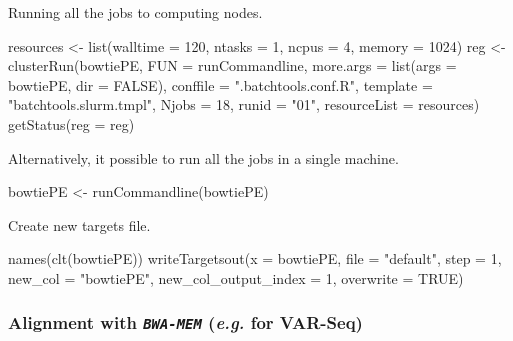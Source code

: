 \documentclass[14pt,]{article}
\newcommand{\hlnum}[1]{\textcolor[rgb]{0.816,0.125,0.439}{#1}}%
\newcommand{\hlstr}[1]{\textcolor[rgb]{0.251,0.627,0.251}{#1}}%
\newcommand{\hlstd}[1]{\textcolor[rgb]{0.251,0.251,0.251}{#1}}%
\newcommand{\hlkwc}[1]{\textcolor[rgb]{0.251,0.251,0.251}{#1}}%
\newcommand{\hlkwd}[1]{\textcolor[rgb]{0.878,0.439,0.125}{#1}}%
\newenvironment{Shaded}{\begin{myshaded}}{\end{myshaded}}
\newcommand{\KeywordTok}[1]{\hlkwd{#1}}
\newcommand{\DataTypeTok}[1]{\hlkwc{#1}}
\newcommand{\DecValTok}[1]{\hlnum{#1}}
\newcommand{\StringTok}[1]{\hlstr{#1}}
\newcommand{\OtherTok}[1]{{#1}}
\newcommand{\NormalTok}[1]{\hlstd{#1}}
\begin{document}
Running all the jobs to computing nodes.

\begin{Shaded}
\begin{Highlighting}[]
\NormalTok{resources <-}\StringTok{ }\KeywordTok{list}\NormalTok{(}\DataTypeTok{walltime =} \DecValTok{120}\NormalTok{, }\DataTypeTok{ntasks =} \DecValTok{1}\NormalTok{, }\DataTypeTok{ncpus =} \DecValTok{4}\NormalTok{, }\DataTypeTok{memory =} \DecValTok{1024}\NormalTok{)}
\NormalTok{reg <-}\StringTok{ }\KeywordTok{clusterRun}\NormalTok{(bowtiePE, }\DataTypeTok{FUN =}\NormalTok{ runCommandline, }\DataTypeTok{more.args =} \KeywordTok{list}\NormalTok{(}\DataTypeTok{args =}\NormalTok{ bowtiePE, }
    \DataTypeTok{dir =} \OtherTok{FALSE}\NormalTok{), }\DataTypeTok{conffile =} \StringTok{".batchtools.conf.R"}\NormalTok{, }\DataTypeTok{template =} \StringTok{"batchtools.slurm.tmpl"}\NormalTok{, }
    \DataTypeTok{Njobs =} \DecValTok{18}\NormalTok{, }\DataTypeTok{runid =} \StringTok{"01"}\NormalTok{, }\DataTypeTok{resourceList =}\NormalTok{ resources)}
\KeywordTok{getStatus}\NormalTok{(}\DataTypeTok{reg =}\NormalTok{ reg)}
\end{Highlighting}
\end{Shaded}

Alternatively, it possible to run all the jobs in a single machine.

\begin{Shaded}
\begin{Highlighting}[]
\NormalTok{bowtiePE <-}\StringTok{ }\KeywordTok{runCommandline}\NormalTok{(bowtiePE)}
\end{Highlighting}
\end{Shaded}

Create new targets file.

\begin{Shaded}
\begin{Highlighting}[]
\KeywordTok{names}\NormalTok{(}\KeywordTok{clt}\NormalTok{(bowtiePE))}
\KeywordTok{writeTargetsout}\NormalTok{(}\DataTypeTok{x =}\NormalTok{ bowtiePE, }\DataTypeTok{file =} \StringTok{"default"}\NormalTok{, }\DataTypeTok{step =} \DecValTok{1}\NormalTok{, }\DataTypeTok{new_col =} \StringTok{"bowtiePE"}\NormalTok{, }\DataTypeTok{new_col_output_index =} \DecValTok{1}\NormalTok{, }
    \DataTypeTok{overwrite =} \OtherTok{TRUE}\NormalTok{)}
\end{Highlighting}
\end{Shaded}

\hypertarget{alignment-with-bwa-mem-e.g.-for-var-seq}{%
\subsubsection{\texorpdfstring{Alignment with \emph{\texttt{BWA-MEM}} (\emph{e.g.} for VAR-Seq)}{Alignment with BWA-MEM (e.g. for VAR-Seq)}}\label{alignment-with-bwa-mem-e.g.-for-var-seq}}
\end{document}
